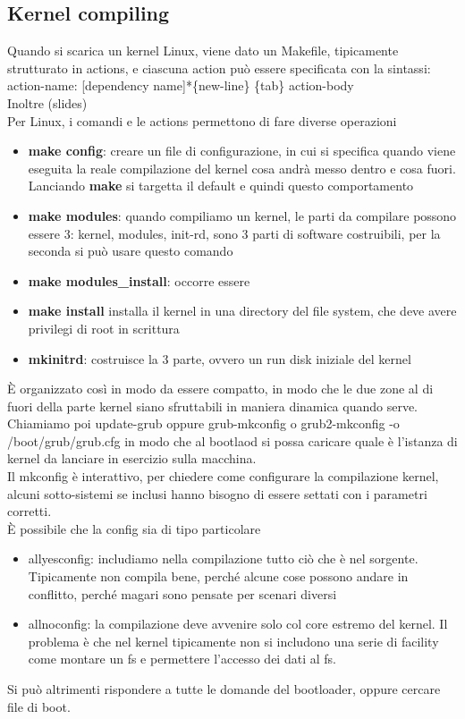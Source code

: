 \documentclass[12pt, oneside]{extbook}
\begin{document}
\subsection{Kernel compiling}
Quando si scarica un kernel Linux, viene dato un Makefile, tipicamente strutturato in actions, e ciascuna action può essere specificata con la sintassi: \textsf{action-name: [dependency name]*\{new-line\} \{tab\} action-body}\\
Inoltre (slides)\\ Per Linux, i comandi e le actions permettono di fare diverse operazioni
\begin{itemize}
\item \textbf{make config}: creare un file di configurazione, in cui si specifica quando viene eseguita la reale compilazione del kernel cosa andrà messo dentro e cosa fuori. Lanciando \textbf{make} si targetta il default e quindi questo comportamento
\item \textbf{make modules}: quando compiliamo un kernel, le parti da compilare possono essere 3: kernel, modules, init-rd, sono 3 parti di software costruibili, per la seconda si può usare questo comando
\item \textbf{make modules\_install}: occorre essere
\item \textbf{make install} installa il kernel in una directory del file system, che deve avere privilegi di root in scrittura
\item \textbf{mkinitrd}: costruisce la 3 parte, ovvero un run disk iniziale del kernel
\end{itemize}
È organizzato così in modo da essere compatto, in modo che le due zone al di fuori della parte kernel siano sfruttabili in maniera dinamica quando serve. Chiamiamo poi update-grub oppure grub-mkconfig o grub2-mkconfig -o /boot/grub/grub.cfg in modo che al bootlaod si possa caricare quale è l'istanza di kernel da lanciare in esercizio sulla macchina.\\ Il mkconfig è interattivo, per chiedere come configurare la compilazione kernel, alcuni sotto-sistemi se inclusi hanno bisogno di essere settati con i parametri corretti.\\ È possibile che la config sia di tipo particolare
\begin{itemize}
\item allyesconfig: includiamo nella compilazione tutto ciò che è nel sorgente. Tipicamente non compila bene, perché alcune cose possono andare in conflitto, perché magari sono pensate per scenari diversi
\item allnoconfig: la compilazione deve avvenire solo col core estremo del kernel. Il problema è che nel kernel tipicamente non si includono una serie di facility come montare un fs e permettere l'accesso dei dati al fs.
\end{itemize}
Si può altrimenti rispondere a tutte le domande del bootloader, oppure cercare file di boot.
\end{document}
